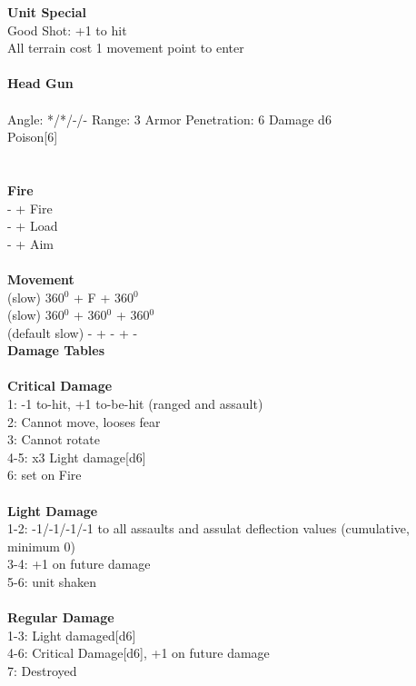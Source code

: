 {\bf Unit Special} \\
Good Shot: +1 to hit\\ All terrain cost 1 movement point to enter
\ \\
\ \\
{\bf Head Gun } \\
\ \\
Angle: */*/-/- Range: 3 Armor Penetration: 6 Damage d6\\ Poison[6] \\
\indent  \\





\ \\ {\bf Fire  } \\
- + Fire \\
- + Load \\
- + Aim \\
\ \\ {\bf Movement } \\
(slow) 360$^0$ + F + 360$^0$ \\
(slow) 360$^0$ + 360$^0$ + 360$^0$ \\
(default slow) - + - + - \\



{\bf Damage Tables} \\
\ \\ {\bf Critical Damage } \\
1: -1 to-hit, +1 to-be-hit (ranged and assault) \\
2: Cannot move, looses fear \\
3: Cannot rotate \\
4-5: x3 Light damage[d6] \\
6: set on Fire \\
\ \\ {\bf Light Damage } \\
1-2: -1/-1/-1/-1 to all assaults and assulat deflection values (cumulative, minimum 0) \\
3-4: +1 on future damage \\
5-6: unit shaken \\
\ \\ {\bf Regular Damage } \\
1-3: Light damaged[d6] \\
4-6: Critical Damage[d6], +1 on future damage \\
7: Destroyed \\



